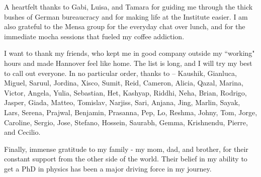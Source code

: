 A heartfelt thanks to Gabi, Luisa, and Tamara for guiding me through the thick bushes of German bureaucracy and for making life at the Institute easier.  I am also grateful to the Mensa group for the everyday chat over lunch, and for the immediate mocha sessions that fueled my coffee addiction. 

I want to thank my friends, who kept me in good company outside my ``working" hours and made Hannover feel like home. The list is long, and I will try my best to call out everyone. In no particular order, thanks to --  Kaushik, Gianluca, Miguel, Saruul, Jordina, Xisco, Sumit, Reid, Cameron, Alicia, Qazal, Marina, Victor, Angela, Yulia, Sebastian, Het, Kashyap, Riddhi, Neha, Brian, Rodrigo, Jasper, Giada, Matteo, Tomislav, Narjiss, Sari, Anjana, Jing, Marlin, Sayak, Lars, Serena, Prajwal, Benjamin, Prasanna, Pep, Lo, Reshma, Johny, Tom, Jorge, Caroline, Sergio, Jose, Stefano, Hossein, Saurabh, Gemma, Krishnendu, Pierre, and Cecilio. 

Finally, immense gratitude to my family - my mom, dad, and brother, for their constant support from the other side of the world. Their belief in my ability to get a PhD in physics has been a major driving force in my journey.

